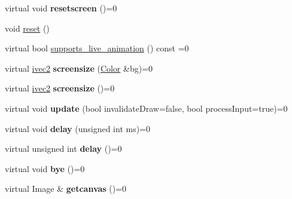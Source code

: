 \begin{DoxyCompactItemize}
\item 
\mbox{\label{classcturtle_1_1AbstractTurtleScreen_a2a705428bc1fd07300ebcf1a6b10e989}} 
virtual void {\bfseries resetscreen} ()=0
\item 
void \hyperlink{classcturtle_1_1AbstractTurtleScreen_ac791e1eca792e71c356006c96eb98788}{reset} ()
\item 
virtual bool \hyperlink{classcturtle_1_1AbstractTurtleScreen_aa9651fa98eefdb83fd99d476217b5414}{supports\+\_\+live\+\_\+animation} () const =0
\item 
\mbox{\label{classcturtle_1_1AbstractTurtleScreen_a67b23a8833900072eb9079b836b1796e}} 
virtual \hyperlink{structcturtle_1_1ivec2}{ivec2} {\bfseries screensize} (\hyperlink{classcturtle_1_1Color}{Color} \&bg)=0
\item 
\mbox{\label{classcturtle_1_1AbstractTurtleScreen_a9e8443b41b8d0765993b1b6fb5cfb94f}} 
virtual \hyperlink{structcturtle_1_1ivec2}{ivec2} {\bfseries screensize} ()=0
\item 
\mbox{\label{classcturtle_1_1AbstractTurtleScreen_a85ab4fad60333c90051219e32a299686}} 
virtual void {\bfseries update} (bool invalidate\+Draw=false, bool process\+Input=true)=0
\item 
\mbox{\label{classcturtle_1_1AbstractTurtleScreen_a779ca47025b1d005ab0dcc5a0c368ac8}} 
virtual void {\bfseries delay} (unsigned int ms)=0
\item 
\mbox{\label{classcturtle_1_1AbstractTurtleScreen_ab1d6569b39973c6df6507e4f9890407e}} 
virtual unsigned int {\bfseries delay} ()=0
\item 
\mbox{\label{classcturtle_1_1AbstractTurtleScreen_a04de9abc6c3a8f046568c7d1a842d168}} 
virtual void {\bfseries bye} ()=0
\item 
\mbox{\label{classcturtle_1_1AbstractTurtleScreen_a090a77eb87eab4a3d3e4f1b9476abff2}} 
virtual Image \& {\bfseries getcanvas} ()=0
\item 

\end{DoxyCompactItemize}
